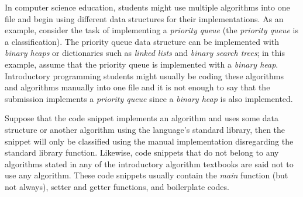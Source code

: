 In computer science education, students might use multiple algorithms into one file 
and begin using different data structures for their implementations. As an example, 
consider the task of implementing a \textit{priority queue} (the \textit{priority queue} is a classification). 
The priority queue data structure can be implemented with \textit{binary heaps} or dictionaries 
such as \textit{linked lists} and \textit{binary search trees}; in this example, assume that the priority 
queue is implemented with a \textit{binary heap}. Introductory programming students might usually 
be coding these algorithms and algorithms manually into one file and it is not enough to 
say that the submission implements a \textit{priority queue} since a \textit{binary heap} is also implemented. 

Suppose that the code snippet implements an algorithm and uses some data structure or 
another algorithm using the language’s standard library, then the snippet will only be 
classified using the manual implementation disregarding the standard library function. 
Likewise, code snippets that do not belong to any algorithms stated in any of the 
introductory algorithm textbooks are said not to use any algorithm. These code snippets 
usually contain the \textit{main} function (but not always), setter and getter functions, 
and boilerplate codes.
